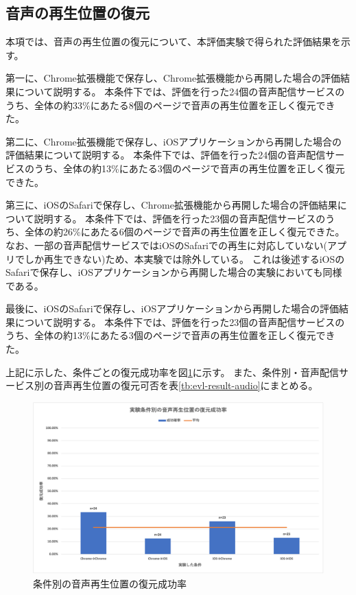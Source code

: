 
\subsection{音声の再生位置の復元}
本項では、音声の再生位置の復元について、本評価実験で得られた評価結果を示す。

第一に、Chrome拡張機能で保存し、Chrome拡張機能から再開した場合の評価結果について説明する。
本条件下では、評価を行った24個の音声配信サービスのうち、全体の約33\%にあたる8個のページで音声の再生位置を正しく復元できた。

第二に、Chrome拡張機能で保存し、iOSアプリケーションから再開した場合の評価結果について説明する。
本条件下では、評価を行った24個の音声配信サービスのうち、全体の約13\%にあたる3個のページで音声の再生位置を正しく復元できた。

第三に、iOSのSafariで保存し、Chrome拡張機能から再開した場合の評価結果について説明する。
本条件下では、評価を行った23個の音声配信サービスのうち、全体の約26\%にあたる6個のページで音声の再生位置を正しく復元できた。
なお、一部の音声配信サービスではiOSのSafariでの再生に対応していない(アプリでしか再生できない)ため、本実験では除外している。
これは後述するiOSのSafariで保存し、iOSアプリケーションから再開した場合の実験においても同様である。

最後に、iOSのSafariで保存し、iOSアプリケーションから再開した場合の評価結果について説明する。
本条件下では、評価を行った23個の音声配信サービスのうち、全体の約13\%にあたる3個のページで音声の再生位置を正しく復元できた。

上記に示した、条件ごとの復元成功率を図\ref{fig:success-rate-audio}に示す。
また、条件別・音声配信サービス別の音声再生位置の復元可否を表\ref{tb:evl-result-audio}にまとめる。

\begin{figure}[htbp]
  \label{fig:success-rate-audio}
  \begin{center}
    \includegraphics[bb=0 0 692 408.8,width=15cm]{img/060_evaluation/result/audio/success-rate-audio.pdf}
  \end{center}
  \caption{条件別の音声再生位置の復元成功率}
\end{figure}

